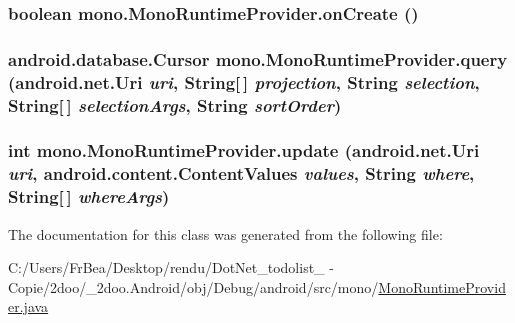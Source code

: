 \hypertarget{classmono_1_1_mono_runtime_provider_c5640d3ce8472accc1953fe591e683c3}{
\subsubsection[{onCreate}]{\setlength{\rightskip}{0pt plus 5cm}boolean mono.MonoRuntimeProvider.onCreate ()}}
\label{classmono_1_1_mono_runtime_provider_c5640d3ce8472accc1953fe591e683c3}


\hypertarget{classmono_1_1_mono_runtime_provider_5f038667e16324d54f940968f4abd86f}{
\subsubsection[{query}]{\setlength{\rightskip}{0pt plus 5cm}android.database.Cursor mono.MonoRuntimeProvider.query (android.net.Uri {\em uri}, \/  String\mbox{[}$\,$\mbox{]} {\em projection}, \/  String {\em selection}, \/  String\mbox{[}$\,$\mbox{]} {\em selectionArgs}, \/  String {\em sortOrder})}}
\label{classmono_1_1_mono_runtime_provider_5f038667e16324d54f940968f4abd86f}


\hypertarget{classmono_1_1_mono_runtime_provider_70342b01de97d26ab215db961f4a714c}{
\subsubsection[{update}]{\setlength{\rightskip}{0pt plus 5cm}int mono.MonoRuntimeProvider.update (android.net.Uri {\em uri}, \/  android.content.ContentValues {\em values}, \/  String {\em where}, \/  String\mbox{[}$\,$\mbox{]} {\em whereArgs})}}
\label{classmono_1_1_mono_runtime_provider_70342b01de97d26ab215db961f4a714c}




The documentation for this class was generated from the following file:\begin{CompactItemize}
\item 
C:/Users/FrBea/Desktop/rendu/DotNet\_\-todolist\_ - Copie/2doo/\_\-2doo.Android/obj/Debug/android/src/mono/\hyperlink{_mono_runtime_provider_8java}{MonoRuntimeProvider.java}\end{CompactItemize}
